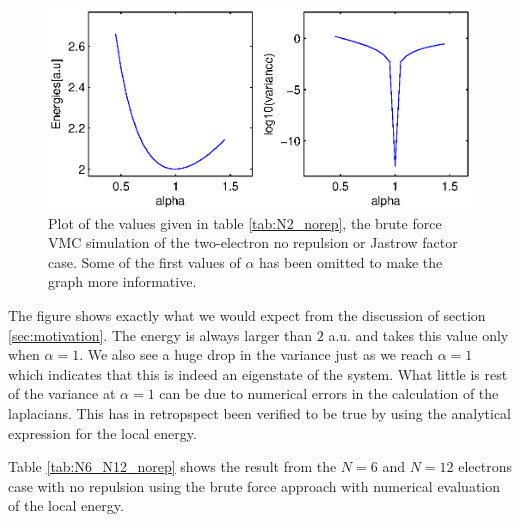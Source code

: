 \begin{figure}[h!]
	\centering 	
	\includegraphics[width=\textwidth]{results/N2_norep.eps}
	\caption{Plot of the values given in table \ref{tab:N2_norep}, the brute force VMC simulation of the two-electron no repulsion or Jastrow factor case. 
	Some of the first values of $\alpha$ has been omitted to make the graph more informative.}
	\label{fig:N2_norep}
\end{figure}

The figure shows exactly what we would expect from the discussion of section \ref{sec:motivation}. 
The energy is always larger than $2$ a.u. and takes this value only when $\alpha = 1$. 
We also see a huge drop in the variance just as we reach $\alpha = 1$ which indicates that this is indeed an eigenstate of the system.
What little is rest of the variance at $\alpha=1$ can be due to numerical errors in the calculation of the laplacians. 
This has in retropspect been verified to be true by using the analytical expression for the local energy. 

Table \ref{tab:N6_N12_norep} shows the result from the $N=6$ and $N=12$ electrons case with no repulsion using the brute force approach with numerical evaluation of the local energy.

